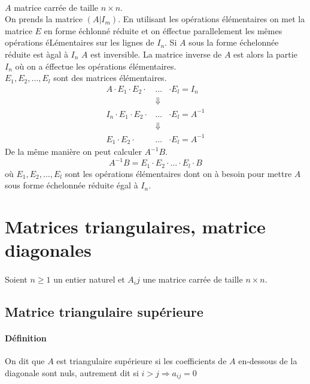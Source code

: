 \paragraph{} $A$ matrice carrée de taille $n\times n$. \\
On prends la matrice $(A \vert I_m)$. En utilisant les opérations élémentaires on met la matrice $E$ en forme échlonné réduite et on éffectue parallelement les mêmes opérations éLémentaires sur les lignes de $I_n$. Si $A$ sous la forme échelonnée réduite est àgal à $I_n$ $A$ est inversible. La matrice inverse de $A$ est alors la partie $I_n$ où on a éffectue les opérations élémentaires. \\
$E_1, E_2, \ldots, E_l$ sont des matrices élémentaires.
\begin{eqnarray*}
  A \cdot E_1 \cdot E_2 \cdot &\ldots& \cdot E_l = I_n \\
  &\Downarrow& \\
  I_n \cdot E_1 \cdot E_2 \cdot &\ldots& \cdot E_l = A^{-1} \\
  &\Downarrow& \\
  E_1 \cdot E_2 \cdot &\ldots& \cdot E_l = A^{-1}
\end{eqnarray*}
De la même manière on peut calculer $A^{-1} B$.
$$A^{-1} B = E_1 \cdot E_2 \cdot \ldots \cdot E_l \cdot B$$
où $E_1, E_2, \ldots, E_l$ sont les opérations élémentaires dont on à besoin pour mettre $A$ sous forme échelonnée réduite égal à $I_n$.

%
%
\section{Matrices triangulaires, matrice diagonales}
%
%
\paragraph{} Soient $n \geq 1$ un entier naturel et $A_ij$ une matrice carrée de taille $n\times n$.

%
\subsection{Matrice triangulaire supérieure}
%
\paragraph{Définition} On dit que $A$ est triangulaire supérieure si les coefficients de $A$ en-dessous de la diagonale sont nuls, autrement dit si $i > j \Rightarrow a_{ij} = 0$

